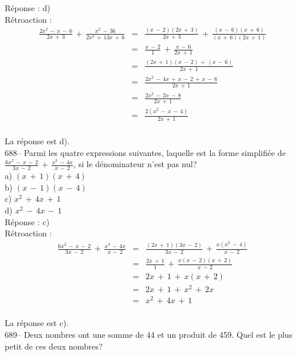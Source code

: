 ﻿\documentclass[letterpaper, 12pt]{article}
\begin{document}
R\'eponse : d)\\

R\'etroaction : \\
\begin{eqnarray*}
\frac{2x^{2}\,-\,x\,-\,6}{2x\,+\,3}\,+\,\frac{x^{2}\,-\,36}{2x^{2}\,+\,13x\,+\,6}&=&\frac{(x\,-\,2)(2x\,+\,3)}{2x\,+\,3}\,+\,\frac{(x\,-\,6)(x\,+\,6)}{(x\,+\,6)(2x\,+\,1)}\\[2mm]
&=&\frac{x\,-\,2}{1}\,+\,\frac{x\,-\,6}{2x\,+\,1}\\[2mm]
&=&\frac{(2x\,+\,1)(x\,-\,2)\,+\,(x\,-\,6)}{2x\,+\,1}\\[2mm]
&=&\frac{2x^{2}\,-\,4x\,+\,x\,-\,2\,+\,x\,-\,6}{2x\,+\,1}\\[2mm]
&=&\frac{2x^{2}\,-\,2x\,-\,8}{2x\,+\,1}\\[2mm]
&=&\frac{2(x^{2}\,-\,x\,-\,4)}{2x\,+\,1}\\
\end{eqnarray*}

La r\'eponse est d).\\

688-- Parmi les quatre expressions suivantes, laquelle est la forme
simplifi\'ee de
$\frac{6x^{2}\,-\,x\,-\,2}{3x\,-\,2}\,+\,\frac{x^{3}\,-\,4x}{x\,-\,2}$, si
le d\'enominateur n'est pas nul?\\
a) $(x\,+\,1)(x\,+\,4)$\\
b) $(x\,-\,1)(x\,-\,4)$\\
c) $x^{2}\,+\,4x\,+\,1$\\
d) $x^{2}\,-\,4x\,-\,1$\\

R\'eponse : c)\\

R\'etroaction : \\
\begin{eqnarray*}
\frac{6x^{2}\,-\,x\,-\,2}{3x\,-\,2}\,+\,\frac{x^{3}\,-\,4x}{x\,-\,2}&=&\frac{(2x\,+\,1)(3x\,-\,2)}{3x\,-\,2}\,+\,\frac{x(x^{2}\,-\,4)}{x\,-\,2}\\[2mm]
&=&\frac{2x\,+\,1}{1}\,+\,\frac{x(x\,-\,2)(x\,+\,2)}{x\,-\,2}\\[2mm]
&=&2x\,+\,1\,+\,x(x\,+\,2)\\[2mm]
&=&2x\,+\,1\,+\,x^{2}\,+\,2x\\[2mm]
&=&x^{2}\,+\,4x\,+\,1\\
\end{eqnarray*}

La r\'eponse est c).\\

689-- Deux nombres ont une somme de 44 et un produit de 459.  Quel est le
plus petit de ces deux nombres?\\
\end{document}

